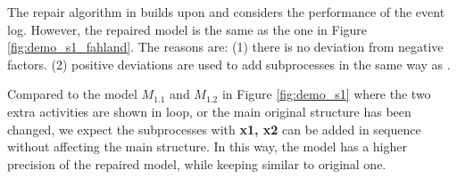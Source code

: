 The repair algorithm in  \cite{dees2017enhancing} builds upon  \cite{fahland2015model} and considers the performance of the event log. However, the repaired model is the same as the one in Figure \ref{fig:demo_s1_fahland}. The reasons are: (1) there is no deviation from negative factors. (2) positive deviations are used to add subprocesses in the same way as  \cite{fahland2015model}. 


Compared to the model $M_{1.1}$ and $M_{1.2}$ in Figure \ref{fig:demo_s1} where the two extra activities are shown in loop, or the main original structure has been changed, we expect the subprocesses with \textbf{x1, x2} can be added in sequence without affecting the main structure. In this way, the model has a higher precision of the repaired model, while keeping similar to original one. %

